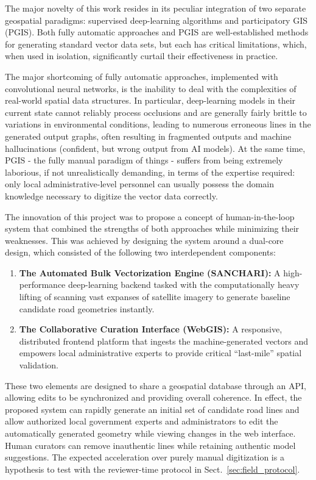 \documentclass[10pt,a4paper,twocolumn]{article}
\begin{document}
The major novelty of this work resides in its peculiar integration of two separate geospatial paradigms: supervised deep-learning algorithms and participatory GIS (PGIS). Both fully automatic approaches and PGIS are well-established methods for generating standard vector data sets, but each has critical limitations, which, when used in isolation, significantly curtail their effectiveness in practice.

The major shortcoming of fully automatic approaches, implemented with convolutional neural networks, is the inability to deal with the complexities of real-world spatial data structures. In particular, deep-learning models in their current state cannot reliably process occlusions and are generally fairly brittle to variations in environmental conditions, leading to numerous erroneous lines in the generated output graphs, often resulting in fragmented outputs and machine hallucinations (confident, but wrong output from AI models). At the same time, PGIS - the fully manual paradigm of things - suffers from being extremely laborious, if not unrealistically demanding, in terms of the expertise required: only local administrative-level personnel can usually possess the domain knowledge necessary to digitize the vector data correctly.


The innovation of this project was to propose a concept of human-in-the-loop system that combined the strengths of both approaches while minimizing their weaknesses. This was achieved by designing the system around a dual-core design, which consisted of the following two interdependent components:
\begin{enumerate}
    \item \textbf{The Automated Bulk Vectorization Engine (SANCHARI):} A high-performance deep-learning backend tasked with the computationally heavy lifting of scanning vast expanses of satellite imagery to generate baseline candidate road geometries instantly.
    \item \textbf{The Collaborative Curation Interface (WebGIS):} A responsive, distributed frontend platform that ingests the machine-generated vectors and empowers local administrative experts to provide critical ``last-mile'' spatial validation.
\end{enumerate}

These two elements are designed to share a geospatial database through an API, allowing edits to be synchronized and providing overall coherence. In effect, the proposed system can rapidly generate an initial set of candidate road lines and allow authorized local government experts and administrators to edit the automatically generated geometry while viewing changes in the web interface. Human curators can remove inauthentic lines while retaining authentic model suggestions. The expected acceleration over purely manual digitization is a hypothesis to test with the reviewer-time protocol in Sect.~\ref{sec:field_protocol}.
\end{document}
